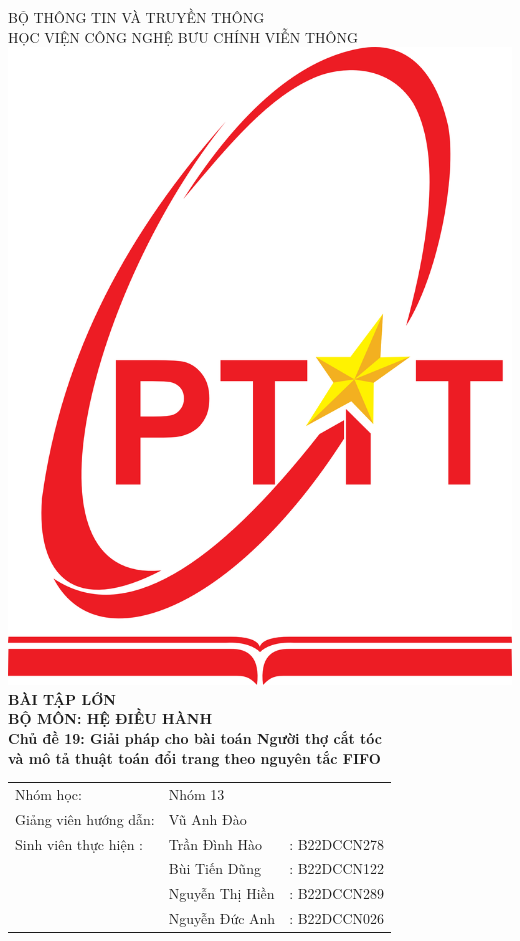\begin{titlepage}

\begin{center}
{BỘ THÔNG TIN VÀ TRUYỀN THÔNG}\\
{HỌC VIỆN CÔNG NGHỆ BƯU CHÍNH VIỄN THÔNG}\\[3.5cm]

\includegraphics[scale=0.06]{images/ptit}\\[0.5cm]

{ \huge \bfseries BÀI TẬP LỚN\\BỘ MÔN: HỆ ĐIỀU HÀNH\\[0.5cm]}
{ \Large \bfseries Chủ đề 19: Giải pháp cho bài toán Người thợ cắt tóc\\và mô tả thuật toán đổi trang theo nguyên tắc FIFO\\[1cm]}

{\large
\begin{tabular}{lll}
Nhóm học:             & Nhóm 13\\
Giảng viên hướng dẫn: & Vũ Anh Đào\\
Sinh viên thực hiện : & Trần Đình Hào   & : B22DCCN278\\ 
                      & Bùi Tiến Dũng   & : B22DCCN122\\
                      & Nguyễn Thị Hiền & : B22DCCN289\\
                      & Nguyễn Đức Anh  & : B22DCCN026\\
\end{tabular}
}



\end{center}
\end{titlepage}
